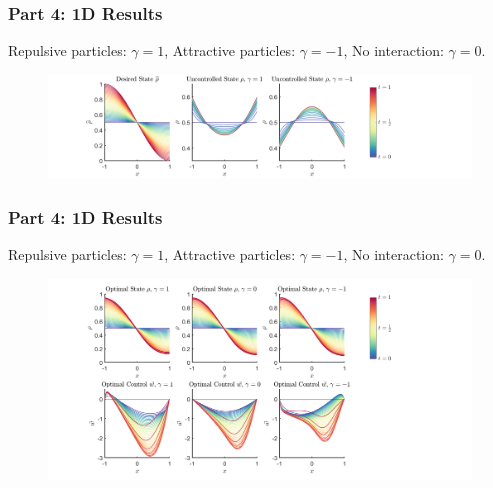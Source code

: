 \documentclass[aspectratio=169,xcolor=dvipsnames]{beamer}
\begin{document}
\begin{frame}
	\frametitle{Part 4: 1D Results}
	Repulsive particles: $\gamma = 1$, Attractive particles: $\gamma = -1$, No interaction: $\gamma =0$.
	\begin{figure}
		\includegraphics[width=15cm]{Figure1.png}
	\end{figure}
	
\end{frame}

\begin{frame}
	\frametitle{Part 4: 1D Results}
	Repulsive particles: $\gamma = 1$, Attractive particles: $\gamma = -1$, No interaction: $\gamma =0$.
	\begin{figure}
		\includegraphics[width=14cm]{Figure2.png}
	\end{figure}
\end{frame}
\end{document}
